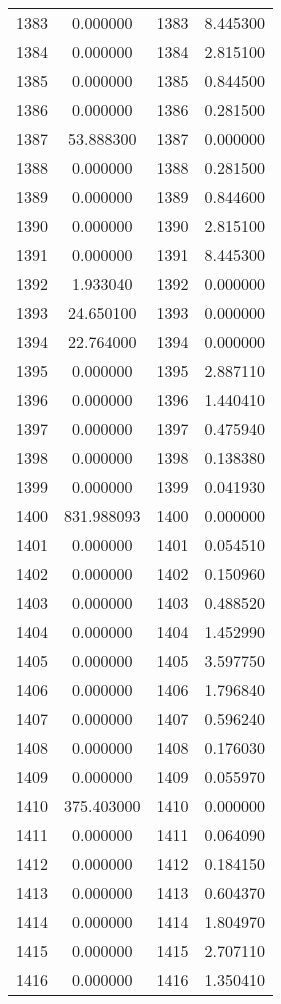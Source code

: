 \documentclass[12pt]{article}
\begin{document}
\begin{longtable}{@{}cccc@{}}
1383 & 0.000000 & 1383 & 8.445300 \\
1384 & 0.000000 & 1384 & 2.815100 \\
1385 & 0.000000 & 1385 & 0.844500 \\
1386 & 0.000000 & 1386 & 0.281500 \\
1387 & 53.888300 & 1387 & 0.000000 \\
1388 & 0.000000 & 1388 & 0.281500 \\
1389 & 0.000000 & 1389 & 0.844600 \\
1390 & 0.000000 & 1390 & 2.815100 \\
1391 & 0.000000 & 1391 & 8.445300 \\
1392 & 1.933040 & 1392 & 0.000000 \\
1393 & 24.650100 & 1393 & 0.000000 \\
1394 & 22.764000 & 1394 & 0.000000 \\
1395 & 0.000000 & 1395 & 2.887110 \\
1396 & 0.000000 & 1396 & 1.440410 \\
1397 & 0.000000 & 1397 & 0.475940 \\
1398 & 0.000000 & 1398 & 0.138380 \\
1399 & 0.000000 & 1399 & 0.041930 \\
1400 & 831.988093 & 1400 & 0.000000 \\
1401 & 0.000000 & 1401 & 0.054510 \\
1402 & 0.000000 & 1402 & 0.150960 \\
1403 & 0.000000 & 1403 & 0.488520 \\
1404 & 0.000000 & 1404 & 1.452990 \\
1405 & 0.000000 & 1405 & 3.597750 \\
1406 & 0.000000 & 1406 & 1.796840 \\
1407 & 0.000000 & 1407 & 0.596240 \\
1408 & 0.000000 & 1408 & 0.176030 \\
1409 & 0.000000 & 1409 & 0.055970 \\
1410 & 375.403000 & 1410 & 0.000000 \\
1411 & 0.000000 & 1411 & 0.064090 \\
1412 & 0.000000 & 1412 & 0.184150 \\
1413 & 0.000000 & 1413 & 0.604370 \\
1414 & 0.000000 & 1414 & 1.804970 \\
1415 & 0.000000 & 1415 & 2.707110 \\
1416 & 0.000000 & 1416 & 1.350410 \\

\end{longtable}
\end{document}
